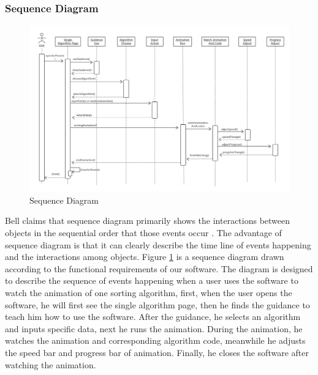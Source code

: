 \documentclass[paper=a4, fontsize=11pt,twoside]{scrartcl}		%
\begin{document}
\subsubsection{Sequence Diagram}
\begin{figure}[htbp]
\centering
\includegraphics[width=1\textwidth,height=1.1\textwidth]{sequence.png}
\caption{Sequence Diagram}
\label{sequence}
\end{figure}
Bell claims that sequence diagram primarily shows the interactions between objects in the sequential order that those events occur \cite{Bell2005UML}. The advantage of sequence diagram is that it can clearly describe the time line of events happening and the interactions among objects. Figure \ref{sequence} is a sequence diagram drawn according to the functional requirements of our software. The diagram is designed to describe the sequence of events happening when a user uses the software to watch the animation of one sorting algorithm, first, when the user opens the software, he will first see the single algorithm page, then he finds the guidance to teach him how to use the software. After the guidance, he selects an algorithm and inputs specific data, next he runs the animation. During the animation, he watches the animation and corresponding algorithm code, meanwhile he adjusts the speed bar and progress bar of animation. Finally, he closes the software after watching the animation.
\end{document}
